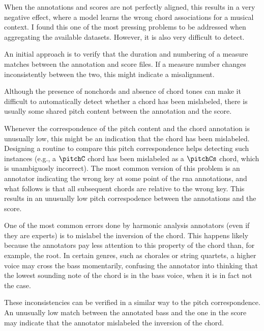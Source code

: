 



When the annotations and scores are not perfectly aligned,
this results in a very negative effect, where a model learns
the wrong chord associations for a musical context. I found
this one of the most pressing problems to be addressed when
aggregating the available datasets. However, it is also very
difficult to detect.

An initial approach is to verify that the duration and
numbering of a measure matches between the annotation and
score files. If a measure number changes inconsistently
between the two, this might indicate a misalignment.


Although the presence of \gls{nonchord}s and absence of
chord tones can make it difficult to automatically detect
whether a chord has been mislabeled, there is usually some
shared pitch content between the annotation and the score.

Whenever the correspondence of the pitch content and the
chord annotation is unusually low, this might be an
indication that the chord has been mislabeled. Designing a
routine to compare this pitch correspondence helps detecting
such instances (e.g., a $\pitchC$ chord has been mislabeled
as a $\pitchCs$ chord, which is unambiguosly incorrect). The
most common version of this problem is an annotator
indicating the wrong key at some point of the \gls{rna}
annotations, and what follows is that all subsequent chords
are relative to the wrong key. This results in an unusually
low pitch correspodence between the annotations and the
score.



One of the most common errors done by harmonic analysis
annotators (even if they are experts) is to mislabel the
inversion of the chord. This happens likely because the
annotators pay less attention to this property of the chord
than, for example, the root. In certain genres, such as
chorales or string quartets, a higher voice may cross the
bass momentarily, confusing the annotator into thinking that
the lowest sounding note of the chord is in the bass voice,
when it is in fact not the case.

These inconsistencies can be verified in a similar way to
the pitch correspondence. An unusually low match between the
annotated bass and the one in the score may indicate that
the annotator mislabeled the inversion of the chord.
